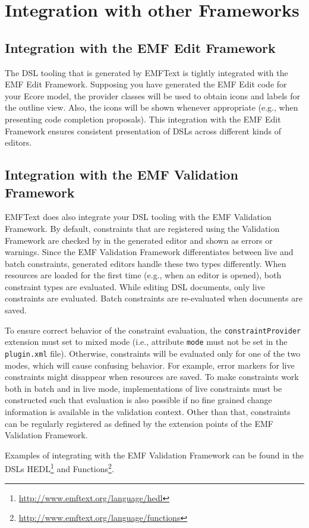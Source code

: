 \chapter{Integration with other Frameworks}

\section{Integration with the EMF Edit Framework}

The DSL tooling that is generated by EMFText is tightly integrated with the EMF
Edit Framework. Supposing you have generated the EMF Edit code for your Ecore 
model, the provider classes will be used to obtain icons and labels for the 
outline view. Also, the icons will be shown whenever appropriate (e.g., when
presenting code completion proposals). This integration with the EMF Edit 
Framework ensures consistent presentation of DSLs across different kinds of
editors.

\section{Integration with the EMF Validation Framework}

EMFText does also integrate your DSL tooling with the EMF Validation Framework.
By default, constraints that are registered using the Validation Framework are
checked by in the generated editor and shown as errors or warnings. Since the
EMF Validation Framework differentiates between live and batch constraints,
generated editors handle these two types differently. When resources are loaded
for the first time (e.g., when an editor is opened), both constraint types are
evaluated. While editing DSL documents, only live constraints are evaluated.
Batch constraints are re-evaluated when documents are saved.

To ensure correct behavior of the constraint evaluation, the 
\texttt{constraintProvider} extension must set to mixed mode (i.e., 
attribute \texttt{mode} must not be set in the \texttt{plugin.xml} file). 
Otherwise, constraints will be evaluated only for one of the two modes, which 
will cause confusing behavior. For example, error markers for live constraints
might disappear when resources are saved. To make constraints work both in batch
and in live mode, implementations of live constraints must be constructed such 
that evaluation is also possible if no fine grained change information is 
available in the validation context. Other than that, constraints can be
regularly registered as defined by the extension points of the EMF Validation 
Framework.

Examples of integrating with the EMF Validation Framework can be found in
the DSLs HEDL\footnote{\url{http://www.emftext.org/language/hedl}} and 
Functions\footnote{\url{http://www.emftext.org/language/functions}}. 

